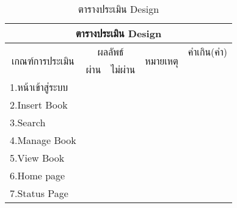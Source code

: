 \begin{table}[H]
\caption{ตารางประเมิน Design}\label{tbl:design}
\begin{tabular}{|l|l|l|l|l|}
\hline
\multicolumn{5}{|c|}{ตารางประเมิน Design}                                                                                                                                                            \\ \hline
\multicolumn{1}{|c|}{\multirow{2}{*}{เกณฑ์การประเมิน}} & \multicolumn{2}{c|}{ผลลัพธ์}                             & \multicolumn{1}{c|}{\multirow{2}{*}{หมายเหตุ}} & \multicolumn{1}{c|}{คำเกิน(คำ)} \\ \cline{2-3} \cline{5-5} 
\multicolumn{1}{|c|}{}                                 & \multicolumn{1}{c|}{ผ่าน} & \multicolumn{1}{c|}{ไม่ผ่าน} & \multicolumn{1}{c|}{}                          & \multicolumn{1}{c|}{}           \\ \hline
1.หน้าเข้าสู่ระบบ                                      &                           &                              &                                                &                                 \\ \hline
2.Insert Book                                          &                           &                              &                                                &                                 \\ \hline
3.Search                                               &                           &                              &                                                &                                 \\ \hline
4.Manage Book                                          &                           &                              &                                                &                                 \\ \hline
5.View Book                                            &                           &                              &                                                &                                 \\ \hline
6.Home page                                            &                           &                              &                                                &                                 \\ \hline
7.Status Page                                          &                           &                              &                                                &                                 \\ \hline
\end{tabular}
\end{table}

